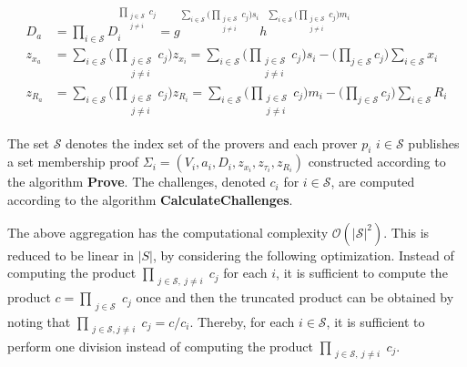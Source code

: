 \begin{equation}
\begin{aligned}
\label{eq:aggDn}
D_a &=\prod_{i\in\mathcal{S}}  D_i ^{\prod_{\substack{j\in\mathcal{S}\\ j\neq i}} c_j }  =  g ^ {\sum_{i\in\mathcal{S}} \Big(\prod_{\substack{j\in\mathcal{S}\\ j\neq i}}   c_j \Big)s_i} h^ {\sum_{i\in\mathcal{S}} \Big(\prod_{\substack{j\in\mathcal{S}\\ j\neq i}}   c_j \Big)m_i}
 \\
z_{x_a} &= \sum_{i\in\mathcal{S}} \Big( \prod_{\substack{j\in\mathcal{S}\\ j\neq i}} c_j \Big) z_{x_i} = \sum_{i\in\mathcal{S}} \Big( \prod_{\substack{j\in\mathcal{S}\\ j\neq i}} c_j \Big)s_i - \big( \prod_{j\in\mathcal{S}} c_j \big) \sum_{i\in\mathcal{S}} x_i
\\
z_{R_a} &=  \sum_{i\in\mathcal{S}}  \Big( \prod_{\substack{j\in\mathcal{S}\\ j\neq i}} c_j \Big) z_{R_i} = \sum_{i\in\mathcal{S}} \Big( \prod_{\substack{j\in\mathcal{S}\\ j\neq i}} c_j \Big)m_i - \big( \prod_{j\in\mathcal{S}} c_j \big) \sum_{i\in\mathcal{S}} R_i 
\end{aligned}
\end{equation}

The set $\mathcal{S}$ denotes the index set of the provers and each prover $p_i$ $i\in\mathcal{S}$ publishes a set membership proof $\Sigma_i = (V_i,a_i,D_i,z_{x_i},z_{\tau_i},z_{R_i})$ constructed according to the algorithm \textbf{Prove}. %
The challenges, denoted $c_i$ for $i\in\mathcal{S}$, are computed according to the algorithm \textbf{CalculateChallenges}.

The above aggregation has the computational complexity $\mathcal{O}(|\mathcal{S}|^2)$. This is reduced to be linear in $|S|$, by considering the following optimization. Instead of computing the product $\prod_{\substack{j\in\mathcal{S},\: j\neq i}} c_j $ for each $i$, it is sufficient to compute the product $c=\prod_{\substack{j\in\mathcal{S}}} c_j $  once and then the truncated product can be obtained by noting that $ \prod_{\substack{j\in\mathcal{S},j\neq i}} c_j = c/c_i $. Thereby, for each $i\in\mathcal{S}$, it is sufficient to perform one division instead of computing the product $\prod_{\substack{j\in\mathcal{S},\:j\neq i}} c_j $.

